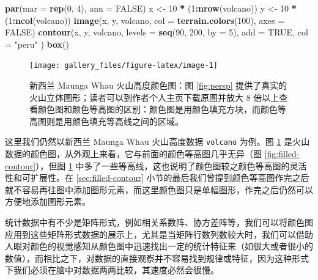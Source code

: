 \documentclass[
  b5paper,
  UTF8,twoside]{book}
\newenvironment{Shaded}{\begin{snugshade}}{\end{snugshade}}
\newcommand{\AttributeTok}[1]{\textcolor[rgb]{0.13,0.29,0.53}{#1}}
\newcommand{\ConstantTok}[1]{\textcolor[rgb]{0.56,0.35,0.01}{#1}}
\newcommand{\DecValTok}[1]{\textcolor[rgb]{0.00,0.00,0.81}{#1}}
\newcommand{\FunctionTok}[1]{\textcolor[rgb]{0.13,0.29,0.53}{\textbf{#1}}}
\newcommand{\NormalTok}[1]{#1}
\newcommand{\OtherTok}[1]{\textcolor[rgb]{0.56,0.35,0.01}{#1}}
\newcommand{\SpecialCharTok}[1]{\textcolor[rgb]{0.81,0.36,0.00}{\textbf{#1}}}
\newcommand{\StringTok}[1]{\textcolor[rgb]{0.31,0.60,0.02}{#1}}
\begin{document}
\begin{Shaded}
\begin{Highlighting}[]
\FunctionTok{par}\NormalTok{(}\AttributeTok{mar =} \FunctionTok{rep}\NormalTok{(}\DecValTok{0}\NormalTok{, }\DecValTok{4}\NormalTok{), }\AttributeTok{ann =} \ConstantTok{FALSE}\NormalTok{)}
\NormalTok{x }\OtherTok{\textless{}{-}} \DecValTok{10} \SpecialCharTok{*}\NormalTok{ (}\DecValTok{1}\SpecialCharTok{:}\FunctionTok{nrow}\NormalTok{(volcano))}
\NormalTok{y }\OtherTok{\textless{}{-}} \DecValTok{10} \SpecialCharTok{*}\NormalTok{ (}\DecValTok{1}\SpecialCharTok{:}\FunctionTok{ncol}\NormalTok{(volcano))}
\FunctionTok{image}\NormalTok{(x, y, volcano, }\AttributeTok{col =} \FunctionTok{terrain.colors}\NormalTok{(}\DecValTok{100}\NormalTok{), }\AttributeTok{axes =} \ConstantTok{FALSE}\NormalTok{)}
\FunctionTok{contour}\NormalTok{(x, y, volcano,}
  \AttributeTok{levels =} \FunctionTok{seq}\NormalTok{(}\DecValTok{90}\NormalTok{, }\DecValTok{200}\NormalTok{, }\AttributeTok{by =} \DecValTok{5}\NormalTok{),}
  \AttributeTok{add =} \ConstantTok{TRUE}\NormalTok{, }\AttributeTok{col =} \StringTok{"peru"}
\NormalTok{)}
\FunctionTok{box}\NormalTok{()}
\end{Highlighting}
\end{Shaded}

\begin{figure}

{\centering \texttt{[image: gallery\_files/figure-latex/image-1]} 

}

\caption[新西兰 Maunga Whau 火山高度数据颜色图]{新西兰 Maunga Whau 火山高度颜色图：图 \ref{fig:persp} 提供了真实的火山立体图形；读者可以到作者个人主页下载原图并放大 8 倍以上查看颜色图和颜色等高图的区别：颜色图是用颜色填充方块，而颜色等高图则是用颜色填充等高线之间的区域。}\label{fig:image}
\end{figure}

这里我们仍然以新西兰 Maunga Whau 火山高度数据 \texttt{volcano} 为例。图 \ref{fig:image}
是火山数据的颜色图，从外观上来看，它与前面的颜色等高图几乎无异（图 \ref{fig:filled-contour}），但图 \ref{fig:image} 中多了一些等高线，这也说明了颜色图较之颜色等高图的灵活性和可扩展性。在 \ref{sec:filled-contour} 小节的最后我们曾提到颜色等高图作完之后就不容易再往图中添加图形元素，而这里颜色图只是单幅图形，作完之后仍然可以方便地添加图形元素。

统计数据中有不少是矩阵形式，例如相关系数阵、协方差阵等，我们可以将颜色图应用到这些矩阵形式数据的展示上，尤其是当矩阵行数列数较大时，我们可以借助人眼对颜色的视觉感知从颜色图中迅速找出一定的统计特征来（如很大或者很小的数值），而相比之下，对数据的直接观察并不容易找到规律或特征，因为这种形式下我们必须在脑中对数据两两比较，其速度必然会很慢。
\end{document}
